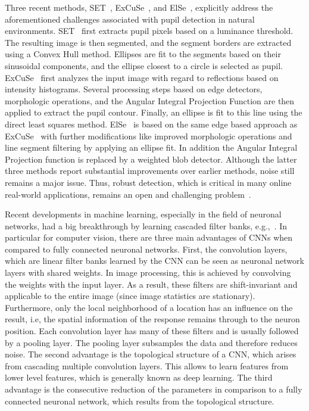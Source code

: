 Three recent methods, SET~\citet{javadi2015set}, ExCuSe~\citet{fuhl2015excuse},
and ElSe~\citet{fuhl2015else}, explicitly address the aforementioned challenges
associated with pupil detection in natural environments.
SET~\citet{javadi2015set} first extracts pupil pixels based on a luminance
threshold. The resulting image is then segmented, and the segment borders are
extracted using a Convex Hull method.  Ellipses are fit to the segments based on
their sinusoidal components, and the ellipse closest to a circle is selected as
pupil.  ExCuSe~\citet{fuhl2015excuse} first analyzes the input image with regard
to reflections based on intensity histograms. Several processing steps based on
edge detectors, morphologic operations, and the Angular Integral Projection
Function are then applied to extract the pupil contour. Finally, an ellipse is
fit to this line using the direct least squares method.
ElSe~\citet{fuhl2015else} is based on the same edge based approach as
ExCuSe~\citet{fuhl2015excuse} with further modifications like improved
morphologic operations and line segment filtering by applying an ellipse fit. In
addition the Angular Integral Projection function is replaced by a weighted blob
detector. Although the latter three methods report substantial improvements over
earlier methods, noise still remains a major issue.  Thus, robust detection,
which is critical in many online real-world applications, remains an open and
challenging problem~\citet{JEMR3657}.

Recent developments in machine learning, especially in the field of
neuronal networks, had a big breakthrough by learning cascaded filter
banks, e.g.,~\citet{krizhevsky2012imagenet,lecun1998gradient}. In particular for
computer vision, there are three main advantages of CNNs when compared to fully
connected neuronal networks.
First, the convolution layers, which are linear filter banks learned
by the CNN can be seen as neuronal network layers with
shared weights.%
 In image processing, this is achieved by convolving the weights with the
input layer. As a result, these filters are shift-invariant and applicable to the
entire image (since image statistics are stationary). Furthermore, only the local neighborhood of a location has an influence on the result, i.e, the
spatial information of the response remains through to the neuron position. Each
convolution layer has many of these filters and is usually followed by a pooling
layer. The pooling layer subsamples the data and therefore reduces noise. The
second advantage is the topological structure of a CNN, which arises from
cascading multiple convolution layers. This allows to learn features from lower
level features, which is generally known as deep learning. The third advantage is
the consecutive reduction of the parameters in comparison to a fully connected
neuronal network, which results from the topological structure.

